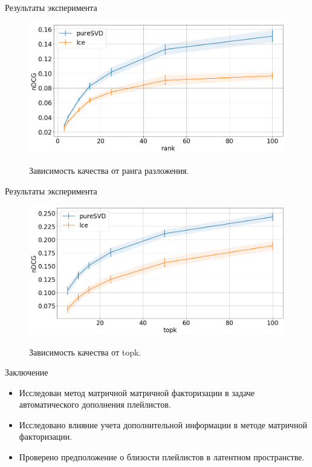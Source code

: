 \documentclass{beamer}
\begin{document}
\begin{frame}{Результаты эксперимента}
\begin{figure}[ht]\center
\includegraphics[width=1\textwidth]{nDCG.pdf}\\
\caption{Зависимость качества от ранга разложения.}
\end{figure}
\end{frame}
\begin{frame}{Результаты эксперимента}
\begin{figure}[ht]\center
\includegraphics[width=1\textwidth]{nDCG2.pdf}\\
\caption{Зависимость качества от  topk.}
\end{figure}
\end{frame}
\begin{frame}{Заключение}
\begin{itemize}
\item Исследован метод матричной матричной факторизации в задаче автоматического дополнения плейлистов.
\item Исследовано влияние учета дополнительной информации в методе матричной факторизации.
\item Проверено предположение о близости плейлистов в латентном пространстве.
\end{itemize}
\end{frame}
\end{document}
